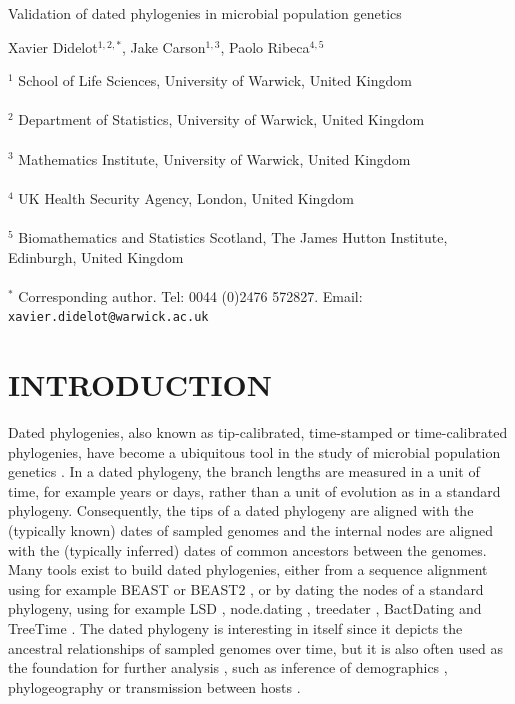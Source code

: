 \documentclass{article}
\begin{document}
{\Large Validation of dated phylogenies in microbial population genetics}


\vspace*{2cm}
Xavier Didelot$^{1,2,*}$, Jake Carson$^{1,3}$, Paolo Ribeca$^{4,5}$

\vspace*{2cm}
$^1$ School of Life Sciences, University of Warwick, United Kingdom\\\\
$^2$ Department of Statistics, University of Warwick, United Kingdom\\\\
$^3$ Mathematics Institute, University of Warwick, United Kingdom\\\\
$^4$ UK Health Security Agency, London, United Kingdom\\\\
$^5$ Biomathematics and Statistics Scotland, The James Hutton Institute, Edinburgh, United Kingdom\\\\
$^*$ Corresponding author. Tel: 0044 (0)2476 572827. Email: \verb+xavier.didelot@warwick.ac.uk+



\newpage
\section*{INTRODUCTION}

Dated phylogenies, also known as tip-calibrated, time-stamped or time-calibrated phylogenies, have become a ubiquitous tool in the study of microbial population genetics 
\citep{Drummond2003,Biek2015,rieuxInferencesTipcalibratedPhylogenies2016}. In a dated phylogeny, the branch lengths are measured in a unit of time, for example years or days,
rather than a unit of evolution as in a standard phylogeny. Consequently, the tips of a dated phylogeny are aligned with the (typically known) dates of sampled genomes and
the internal nodes are aligned with the (typically inferred) dates of common ancestors between the genomes.
Many tools exist to build dated phylogenies, either from a sequence alignment using for example BEAST \citep{Suchard2018} or BEAST2 \citep{Bouckaert2019}, or by
dating the nodes of a standard phylogeny, using for example 
LSD \citep{To2016}, node.dating \citep{Jones2017}, treedater \citep{Volz2017}, BactDating \citep{Didelot2018} and TreeTime \citep{Sagulenko2018}.
The dated phylogeny is interesting in itself since it depicts the ancestral relationships of sampled genomes
over time, but it is also often used as the foundation for further analysis \citep{Didelot2022}, such as inference
of demographics \citep{Baele2016}, phylogeography \citep{Lemey2009} 
or transmission between hosts \citep{Didelot2017}.
\end{document}
